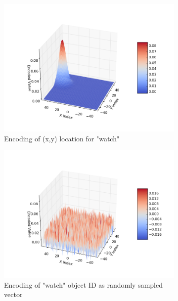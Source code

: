 \documentclass[conference]{IEEEtran}
\begin{document}
\begin{figure}[th!]
		\begin{subfigure}{0.45\columnwidth}
			\center
			\includegraphics[width=\linewidth]{img/coord_example_1.png}
			\caption{Encoding of (x,y) location for "watch"}
			\label{fig:encoding-coord}
		\end{subfigure}
		\begin{subfigure}{0.45\columnwidth}
			\center
			\includegraphics[width=\linewidth]{img/coord_example_2.png}
			\caption{Encoding of "watch" object ID as randomly sampled vector}
			\label{fig:encoding-object}
		\end{subfigure}
		\begin{subfigure}{0.8\columnwidth}
			\center

\end{subfigure}
\end{figure}
\end{document}
